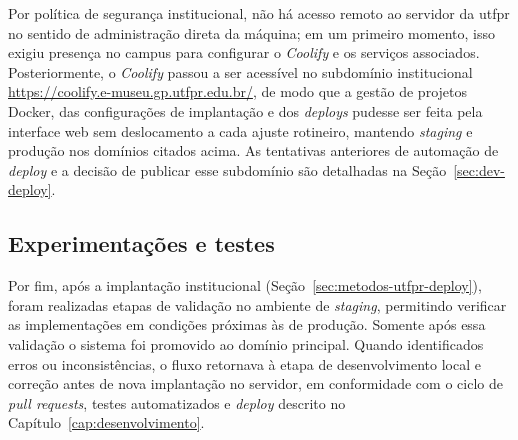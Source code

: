 Por política de segurança institucional, não há acesso remoto ao servidor da \acrshort{utfpr} no sentido de administração direta da máquina; em um primeiro momento, isso exigiu presença no campus para configurar o \textit{Coolify} e os serviços associados. Posteriormente, o \textit{Coolify} passou a ser acessível no subdomínio institucional \url{https://coolify.e-museu.gp.utfpr.edu.br/}, de modo que a gestão de projetos Docker, das configurações de implantação e dos \textit{deploys} pudesse ser feita pela interface web sem deslocamento a cada ajuste rotineiro, mantendo \textit{staging} e produção nos domínios citados acima. As tentativas anteriores de automação de \textit{deploy} e a decisão de publicar esse subdomínio são detalhadas na Seção~\ref{sec:dev-deploy}.


\subsection{Experimentações e testes}

Por fim, após a implantação institucional (Seção~\ref{sec:metodos-utfpr-deploy}), foram realizadas etapas de validação no ambiente de \textit{staging}, permitindo verificar as implementações em condições próximas às de produção. Somente após essa validação o sistema foi promovido ao domínio principal. Quando identificados erros ou inconsistências, o fluxo retornava à etapa de desenvolvimento local e correção antes de nova implantação no servidor, em conformidade com o ciclo de \textit{pull requests}, testes automatizados e \textit{deploy} descrito no Capítulo~\ref{cap:desenvolvimento}. 

